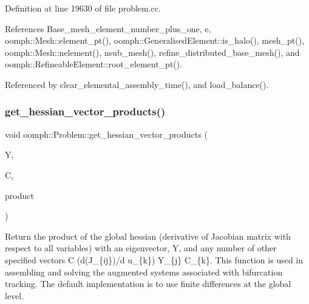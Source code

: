 Definition at line 19630 of file problem.\+cc.



References Base\+\_\+mesh\+\_\+element\+\_\+number\+\_\+plus\+\_\+one, e, oomph\+::\+Mesh\+::element\+\_\+pt(), oomph\+::\+Generalised\+Element\+::is\+\_\+halo(), mesh\+\_\+pt(), oomph\+::\+Mesh\+::nelement(), nsub\+\_\+mesh(), refine\+\_\+distributed\+\_\+base\+\_\+mesh(), and oomph\+::\+Refineable\+Element\+::root\+\_\+element\+\_\+pt().



Referenced by clear\+\_\+elemental\+\_\+assembly\+\_\+time(), and load\+\_\+balance().

\mbox{\label{classoomph_1_1Problem_ac65cbe00a72cfc91ccaea10818f1a507}} 
\subsubsection{\texorpdfstring{get\+\_\+hessian\+\_\+vector\+\_\+products()}{get\_hessian\_vector\_products()}}
{\footnotesize\ttfamily void oomph\+::\+Problem\+::get\+\_\+hessian\+\_\+vector\+\_\+products (\begin{DoxyParamCaption}\item[{\hyperlink{classoomph_1_1DoubleVectorWithHaloEntries}{Double\+Vector\+With\+Halo\+Entries} const \&}]{Y,  }\item[{\hyperlink{classoomph_1_1Vector}{Vector}$<$ \hyperlink{classoomph_1_1DoubleVectorWithHaloEntries}{Double\+Vector\+With\+Halo\+Entries} $>$ const \&}]{C,  }\item[{\hyperlink{classoomph_1_1Vector}{Vector}$<$ \hyperlink{classoomph_1_1DoubleVectorWithHaloEntries}{Double\+Vector\+With\+Halo\+Entries} $>$ \&}]{product }\end{DoxyParamCaption})}



Return the product of the global hessian (derivative of Jacobian matrix with respect to all variables) with an eigenvector, Y, and any number of other specified vectors C (d(J\+\_\+\{ij\})/d u\+\_\+\{k\}) Y\+\_\+\{j\} C\+\_\+\{k\}. This function is used in assembling and solving the augmented systems associated with bifurcation tracking. The default implementation is to use finite differences at the global level. 

